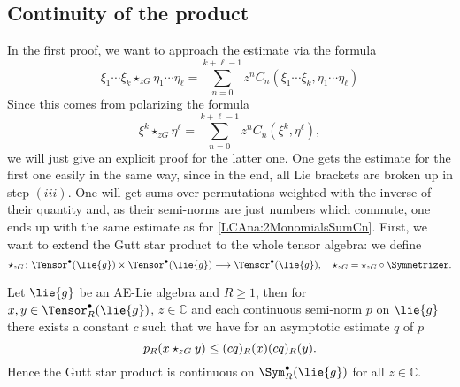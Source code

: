 \subsection{Continuity of the product}
In the first proof, we want to approach the estimate via the formula
\begin{equation*}
    \xi_1 \cdots \xi_k \star_{zG} \eta_1 \cdots \eta_{\ell}
    =
    \sum\limits_{n=0}^{k + \ell -1}
    z^n
    C_n (\xi_1 \cdots \xi_k, \eta_1 \cdots \eta_{\ell})
\end{equation*}
Since this comes from polarizing the formula
\begin{equation}
    \label{LCAna:2MonomialsSumCn}
    \xi^k \star_{zG} \eta^{\ell}
    =
    \sum\limits_{n=0}^{k + \ell -1}
    z^n
    C_n \left( \xi^k, \eta^{\ell} \right),
\end{equation}
we will just give an explicit proof for the latter one. One gets the
estimate for the first one easily in the same way, since in the end,
all Lie brackets are broken up in step $(iii)$. One will get 
sums over permutations weighted with the inverse of their quantity and, as 
their semi-norms are just numbers which commute, one ends up with the same 
estimate as for \eqref{LCAna:2MonomialsSumCn}. First, we want to extend the 
Gutt star product to the whole tensor algebra: we define
\begin{equation*}
	\ostar_{zG}
	\colon
	\Tensor^{\bullet}(\lie{g})
	\times
	\Tensor^{\bullet}(\lie{g})
	\longrightarrow
	\Tensor^{\bullet}(\lie{g})
	, \quad
	\ostar_{zG} 
	= 
	\star_{zG} \circ \Symmetrizer.
\end{equation*}
\begin{theorem}
    \label{Thm:LCAna:Continuity1}%
    Let $\lie{g}$ be an AE-Lie algebra and $R \geq 1$, then for $x, y
    \in \Tensor_R^{\bullet}(\lie{g})$, $z \in \mathbb{C}$ and each 
    continuous semi-norm $p$ on $\lie{g}$ there exists a constant $c$ 
    such that we have for an asymptotic estimate $q$ of $p$
    \begin{equation}
        \label{LCAna:Continuity1}
        p_R(x \star_{zG} y)
        \leq
        (c q)_R(x) (c q)_R(y).
    \end{equation}
    Hence the Gutt star product is continuous on
    $\Sym_R^{\bullet}(\lie{g})$ for all $z \in \mathbb{C}$.
\end{theorem}
